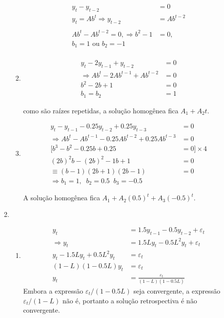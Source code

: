 \begin{enumerate}
\begin{enumerate}
\begin{enumerate}
	\begin{align*}
		y_t-y_{t-2}&=0\\
	y_t=Ab^t\Rightarrow y_{t-2}&=Ab^{t-2}\\
	\\
	Ab^t-Ab^{t-2}=0, \Rightarrow b^2-1&=0,\\
	b_1=1\text{ ou }b_2=-1\\
	\end{align*}
	
	\item 
	
	\begin{align*}
	y_t-2y_{t-1}+y_{t-2}&=0\\
	\Rightarrow Ab^t-2Ab^{t-1}+Ab^{t-2}&=0\\
	b^2-2b+1&=0\\
	b_1=b_2&=1
	\end{align*}
	
		como são raízes repetidas, a solução homogênea fica $A_1+A_2t$.
	
	\item
	
	
	\begin{align*}
		y_t-y_{t-1}-0.25y_{t-2}+0.25y_{t-3}&=0\\
		\Rightarrow Ab^t-Ab^{t-1}-0.25Ab^{t-2}+0.25Ab^{t-3}&=0\\
		[b^3-b^2-0.25b+0.25&=0]\times 4\\
		(2b)^2b-(2b)^2-1b+1&=0\\
		\equiv (b-1)(2b+1)(2b-1)&=0\\
		\Rightarrow b_1=1,\;\;b_2=0.5\;\;b_3=-0.5
	\end{align*}
	
		A solução homogênea fica $A_1+A_2(0.5)^t+A_3(-0.5)^t$.
	\end{enumerate}
	\item
	
	\begin{enumerate}
	\item
	\begin{align*}
		y_t&=1.5y_{t-1}-0.5y_{t-2}+\varepsilon_t\\
		\Rightarrow y_t&=1.5Ly_t-0.5L^2y_{t}+\varepsilon_t\\
		y_t-1.5Ly_t+0.5L^2y_{t}&=\varepsilon_t\\
		(1-L)(1-0.5L)y_t&=\varepsilon_t\\
		y_t&=\frac{\varepsilon_t}{(1-L)(1-0.5L)}
	\end{align*}
	Embora a expressão $\varepsilon_t/(1-0.5L)$ seja convergente, a expressão $\varepsilon_t/(1-L)$ não é, portanto a solução retrospectiva é não convergente.
	

\end{enumerate}
\end{enumerate}
\end{enumerate}
